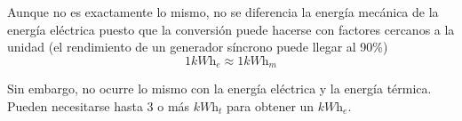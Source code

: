 			Aunque no es exactamente lo mismo, no se diferencia la energía mecánica de la energía eléctrica
			puesto que la conversión puede hacerse con factores cercanos a la unidad (el rendimiento de un
			generador síncrono puede llegar al 90\%)
			\[1 \textit{kWh}_e \approx 1 \textit{kWh}_m\]
			
			Sin embargo, no ocurre lo mismo con la energía eléctrica y la energía térmica. Pueden necesitarse
			hasta 3 o más $\textit{kWh}_t$ para obtener un $\textit{kWh}_e$.
		
		
		
		
		
		
		
		
		
		
		